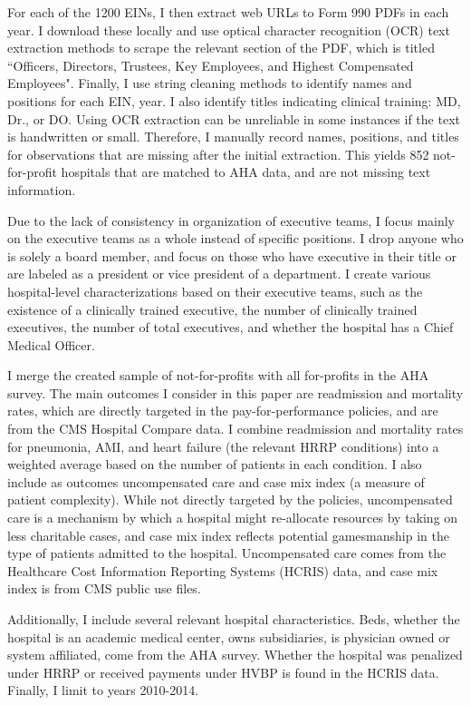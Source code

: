 \documentclass[12pt]{article}
\begin{document}
    For each of the 1200 EINs, I then extract web URLs to Form 990 PDFs in each year. I download these locally and use optical character recognition (OCR) text extraction methods to scrape the relevant section of the PDF, which is titled ``Officers, Directors, Trustees, Key Employees, and Highest Compensated Employees". Finally, I use string cleaning methods to identify names and positions for each EIN, year. I also identify titles indicating clinical training: MD, Dr., or DO. Using OCR extraction can be unreliable in some instances if the text is handwritten or small. Therefore, I manually record names, positions, and titles for observations that are missing after the initial extraction. This yields 852 not-for-profit hospitals that are matched to AHA data, and are not missing text information. 

    Due to the lack of consistency in organization of executive teams, I focus mainly on the executive teams as a whole instead of specific positions. I drop anyone who is solely a board member, and focus on those who have executive in their title or are labeled as a president or vice president of a department. I create various hospital-level characterizations based on their executive teams, such as the existence of a clinically trained executive, the number of clinically trained executives, the number of total executives, and whether the hospital has a Chief Medical Officer.

    I merge the created sample of not-for-profits with all for-profits in the AHA survey. The main outcomes I consider in this paper are readmission and mortality rates, which are directly targeted in the pay-for-performance policies, and are from the CMS Hospital Compare data. I combine readmission and mortality rates for pneumonia, AMI, and heart failure (the relevant HRRP conditions) into a weighted average based on the number of patients in each condition. I also include as outcomes uncompensated care and case mix index (a measure of patient complexity). While not directly targeted by the policies, uncompensated care is a mechanism by which a hospital might re-allocate resources by taking on less charitable cases, and case mix index reflects potential gamesmanship in the type of patients admitted to the hospital. Uncompensated care comes from the Healthcare Cost Information Reporting Systems (HCRIS) data, and case mix index is from CMS public use files. 

    Additionally, I include several relevant hospital characteristics. Beds, whether the hospital is an academic medical center, owns subsidiaries, is physician owned or system affiliated, come from the AHA survey. Whether the hospital was penalized under HRRP or received payments under HVBP is found in the HCRIS data. Finally, I limit to years 2010-2014.
\end{document}
